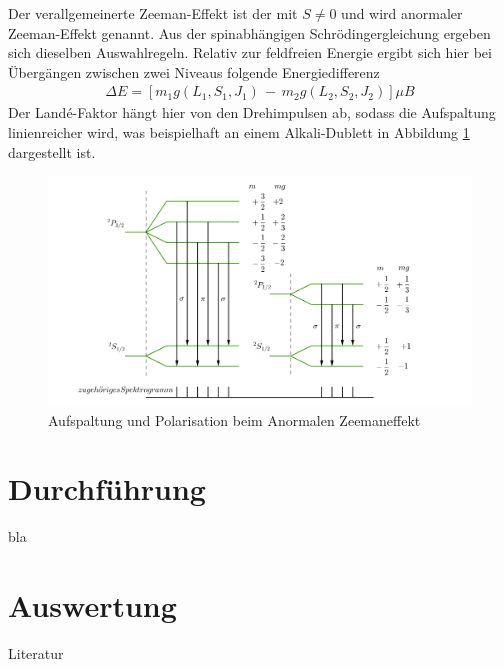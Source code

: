 Der verallgemeinerte Zeeman-Effekt ist der mit $S\neq0$ und wird anormaler Zeeman-Effekt genannt. Aus der spinabhängigen Schrödingergleichung ergeben
sich dieselben Auswahlregeln. Relativ zur feldfreien Energie ergibt sich hier bei Übergängen zwischen zwei Niveaus folgende Energiedifferenz
\begin{align}
 \Delta E = [m_1 g(L_1,S_1,J_1)\, - \,m_2g(L_2,S_2,J_2)]\mu B
\end{align}
Der Landé-Faktor hängt hier von den Drehimpulsen ab, sodass die Aufspaltung linienreicher wird, was beispielhaft an einem Alkali-Dublett in Abbildung
\ref{pic_anorZee} dargestellt ist.
\begin{figure}[H]
\includegraphics[width=1\textwidth]{../pics/anorZee.png}
\caption{Aufspaltung und Polarisation beim Anormalen Zeemaneffekt}
\label{pic_anorZee}
\end{figure}

\section{Durchführung}
bla
\section{Auswertung}

\parskip 340pt
\Large{Literatur}\\\\





